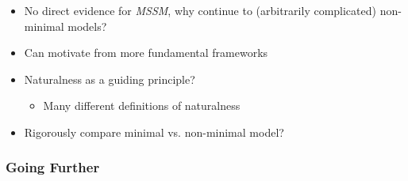 \documentclass[10pt,aspectratio=169]{beamer}
\begin{document}
\begin{frame}
\begin{itemize}
  \item \alert{No direct evidence for \emph{MSSM}, why continue
    to (arbitrarily complicated) non-minimal models?}
  \item Can motivate from more fundamental frameworks
  \item Naturalness as a guiding principle?
    \begin{itemize}\itemsep0.5em
      \item Many different definitions of naturalness
    \end{itemize}
  \item {\color{blue} Rigorously compare minimal vs. non-minimal model?}
  \end{itemize}
\end{frame}

\begin{frame}
  \frametitle{Going Further}
\end{frame}
\end{document}
